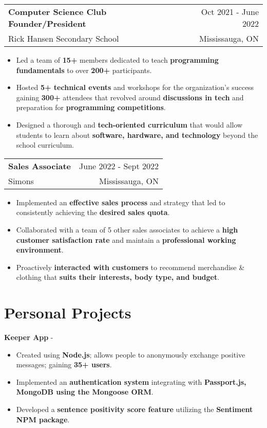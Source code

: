 \documentclass[letterpaper,10.8pt]{article}
\makeatletter
\newcommand{\myhyrest}[2]{\href{#1}{\color{blue}{#2}}}
\newcommand{\resumeSubheading}[4]{
  \vspace{-1pt}\item
    \begin{tabular*}{0.97\textwidth}{l@{\extracolsep{\fill}}r}
      \textbf{#1} & #2 \\
    \small#3 & \small #4 \\
    \end{tabular*}\vspace{-5pt}
}
\makeatother
\begin{document}
    \resumeSubheading
    {Computer Science Club Founder/President}{Oct 2021 - June 2022}
    {Rick Hansen Secondary School}{Mississauga, ON}
    \vspace{2mm}
    \begin{itemize} [noitemsep,nolistsep]
        \item Led a team of \textbf{15+} members dedicated to teach \textbf{programming fundamentals} to over \textbf{200+} participants.
        \item Hosted \textbf{5+ technical events} and workshops for the organization’s success gaining \textbf{300+} attendees that revolved around \textbf{discussions in tech} and preparation for \textbf{programming competitions}.
        \item {Designed a thorough and \textbf{tech-oriented curriculum} that would allow students to learn about \textbf{software, hardware, and technology} beyond the school curriculum}.
    \end{itemize}
    
    
    \resumeSubheading
		{Sales Associate}{June 2022 - Sept 2022}
		{Simons}{Mississauga, ON}
		\vspace{2mm}
    \begin{itemize} [noitemsep,nolistsep]
        \item Implemented an \textbf{effective sales process} and strategy that led to consistently achieving the \textbf{desired sales quota}.
        \item Collaborated with a team of 5 other sales associates to achieve a \textbf{high customer satisfaction rate} and maintain a \textbf{professional working environment}.
        \item Proactively \textbf{interacted with customers} to recommend merchandise & clothing that \textbf{suits their interests, body type, and budget}.
    \end{itemize}

\section{Personal Projects}

    \vspace{1mm}
    \large{\textbf{Keeper App} - \myhyrest{https://github.com/Hamza-Mos/Anonymous-Smiles}{Link}}
    
    \normalsize{\begin{itemize} [noitemsep,nolistsep]
        \item Created using \textbf{Node.js}; allows people to anonymously exchange positive messages; gaining \textbf{35+ users}.
        \item Implemented an \textbf{authentication system} integrating with \textbf{Passport.js, MongoDB using the Mongoose ORM}.
        \item Developed a \textbf{sentence positivity score feature} utilizing the \textbf{Sentiment NPM package}.
    \end{itemize}}
    
\end{document}
